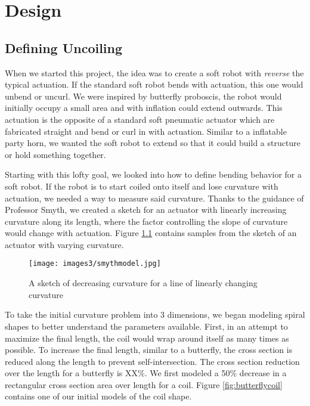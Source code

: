 \chapter{Design}
\section{Defining Uncoiling}

When we started this project, the idea was to create a soft robot with \emph{reverse} the typical actuation. If the standard soft robot bends with actuation, this one would unbend or uncurl. We were inspired by butterfly proboscis, the robot would initially occupy a small area and with inflation could extend outwards. This actuation is the opposite of a standard soft pneumatic actuator which are fabricated straight and bend or curl in with actuation. Similar to a inflatable party horn, we wanted the soft robot to extend so that it could build a structure or hold something together. 

Starting with this lofty goal, we looked into how to define bending behavior for a soft robot. If the robot is to start coiled onto itself and lose curvature with actuation, we needed a way to measure said curvature. Thanks to the guidance of Professor Smyth, we created a sketch for an actuator with linearly increasing curvature along its length, where the factor controlling the slope of curvature would change with actuation. Figure \ref{fig:smythmodel} contains samples from the sketch of an actuator with varying curvature. 

\begin{figure}[h]
    \centering
    \texttt{[image: images3/smythmodel.jpg]}
    \caption{A sketch of decreasing curvature for a line of linearly changing curvature}
    \label{fig:smythmodel}
\end{figure}

To take the initial curvature problem into 3 dimensions, we began modeling spiral shapes to better understand the parameters available. First, in an attempt to maximize the final length, the coil would wrap around itself as many times as possible. To increase the final length, similar to a butterfly, the cross section is reduced along the length to prevent self-intersection. The cross section reduction over the length for a butterfly is XX\%. We first modeled a 50\% decrease in a rectangular cross section area over length for a coil. Figure \ref{fig:butterflycoil} contains one of our initial models of the coil shape. 

